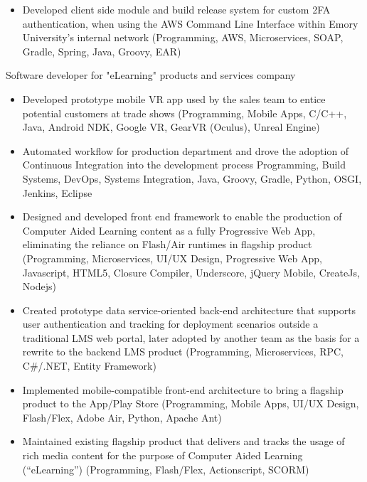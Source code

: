 \begin{itemize}
  \item Developed client side module and build release system for custom 2FA authentication, when using the AWS Command Line Interface within Emory University’s internal network {\tiny (Programming, AWS, Microservices, SOAP, Gradle, Spring, Java, Groovy, EAR)}
\end{itemize}

\divider




Software developer for "eLearning" products and services company

\begin{itemize}
  \item Developed prototype mobile VR app used by the sales team to entice potential customers at trade shows {\tiny (Programming, Mobile Apps, C/C++, Java, Android NDK, Google VR, GearVR (Oculus), Unreal Engine)}
  \item Automated workflow for production department and drove the adoption of Continuous Integration into the development process {\tiny Programming, Build Systems, DevOps, Systems Integration, Java, Groovy, Gradle, Python, OSGI, Jenkins, Eclipse}
  \item Designed and developed front end framework to enable the production of Computer Aided Learning content as a fully Progressive Web App, eliminating the reliance on Flash/Air runtimes in flagship product {\tiny (Programming, Microservices, UI/UX Design, Progressive Web App, Javascript, HTML5, Closure Compiler, Underscore, jQuery Mobile, CreateJs, Nodejs) }
  \item Created prototype data service-oriented back-end architecture that supports user authentication and tracking for deployment scenarios outside a traditional LMS web portal, later adopted by another team as the basis for a rewrite to the backend LMS product {\tiny (Programming, Microservices, RPC, C\#/.NET, Entity Framework)}
\end{itemize}

\begin{itemize}
  \item Implemented mobile-compatible front-end architecture to bring a flagship product to the App/Play Store {\tiny (Programming, Mobile Apps, UI/UX Design, Flash/Flex, Adobe Air, Python, Apache Ant)}
  \item Maintained existing flagship product that delivers and tracks the usage of rich media content for the purpose of Computer Aided Learning (“eLearning”) {\tiny (Programming, Flash/Flex, Actionscript, SCORM)}
\end{itemize}

